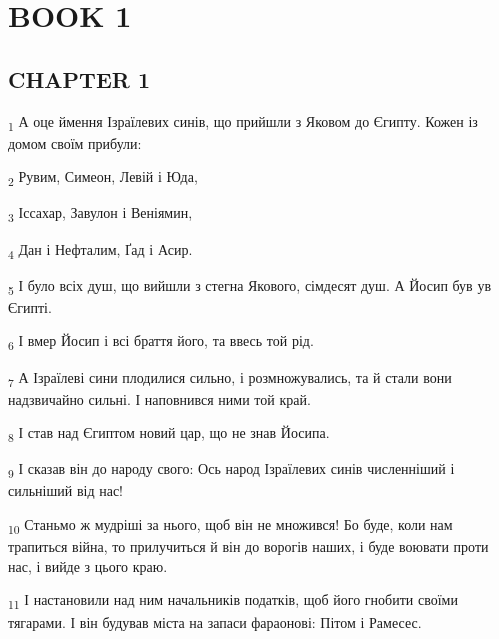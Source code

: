 \section{BOOK 1}
\subsection{CHAPTER 1}
\begin{tcolorbox}
\textsubscript{1} А оце ймення Ізраїлевих синів, що прийшли з Яковом до Єгипту. Кожен із домом своїм прибули:
\end{tcolorbox}
\begin{tcolorbox}
\textsubscript{2} Рувим, Симеон, Левій і Юда,
\end{tcolorbox}
\begin{tcolorbox}
\textsubscript{3} Іссахар, Завулон і Веніямин,
\end{tcolorbox}
\begin{tcolorbox}
\textsubscript{4} Дан і Нефталим, Ґад і Асир.
\end{tcolorbox}
\begin{tcolorbox}
\textsubscript{5} І було всіх душ, що вийшли з стегна Якового, сімдесят душ. А Йосип був ув Єгипті.
\end{tcolorbox}
\begin{tcolorbox}
\textsubscript{6} І вмер Йосип і всі браття його, та ввесь той рід.
\end{tcolorbox}
\begin{tcolorbox}
\textsubscript{7} А Ізраїлеві сини плодилися сильно, і розмножувались, та й стали вони надзвичайно сильні. І наповнився ними той край.
\end{tcolorbox}
\begin{tcolorbox}
\textsubscript{8} І став над Єгиптом новий цар, що не знав Йосипа.
\end{tcolorbox}
\begin{tcolorbox}
\textsubscript{9} І сказав він до народу свого: Ось народ Ізраїлевих синів численніший і сильніший від нас!
\end{tcolorbox}
\begin{tcolorbox}
\textsubscript{10} Станьмо ж мудріші за нього, щоб він не множився! Бо буде, коли нам трапиться війна, то прилучиться й він до ворогів наших, і буде воювати проти нас, і вийде з цього краю.
\end{tcolorbox}
\begin{tcolorbox}
\textsubscript{11} І настановили над ним начальників податків, щоб його гнобити своїми тягарами. І він будував міста на запаси фараонові: Пітом і Рамесес.
\end{tcolorbox}
